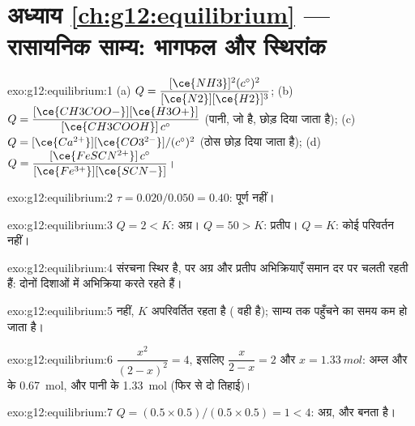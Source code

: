 \section*{अध्याय \ref{ch:g12:equilibrium} --- रासायनिक साम्य: भागफल और स्थिरांक}

\begin{solution}{exo:g12:equilibrium:1}
(a) $Q = \dfrac{[\ce{NH3}]^2 (c^\circ)^2}{[\ce{N2}][\ce{H2}]^3}$;
(b) $Q = \dfrac{[\ce{CH3COO-}][\ce{H3O+}]}{[\ce{CH3COOH}]\,c^\circ}$ (पानी,
जो  है, छोड़ दिया जाता है);
(c) $Q = [\ce{Ca^{2+}}][\ce{CO3^{2-}}]/(c^\circ)^2$ (ठोस छोड़ दिया जाता है);
(d) $Q = \dfrac{[\ce{FeSCN^{2+}}]\,c^\circ}{[\ce{Fe^{3+}}][\ce{SCN-}]}$।
\end{solution}

\begin{solution}{exo:g12:equilibrium:2}
$\tau = 0.020/0.050 = 0.40$: पूर्ण नहीं।
\end{solution}

\begin{solution}{exo:g12:equilibrium:3}
$Q = 2 < K$: अग्र। $Q = 50 > K$: प्रतीप। $Q = K$: कोई परिवर्तन नहीं।
\end{solution}

\begin{solution}{exo:g12:equilibrium:4}
संरचना स्थिर है, पर अग्र और प्रतीप अभिक्रियाएँ समान दर पर
चलती रहती हैं:  दोनों दिशाओं में अभिक्रिया करते रहते हैं।
\end{solution}

\begin{solution}{exo:g12:equilibrium:5}
नहीं, $K$ अपरिवर्तित रहता है ( वही है); साम्य तक पहुँचने का
समय कम हो जाता है।
\end{solution}

\begin{solution}{exo:g12:equilibrium:6}
$\dfrac{x^2}{(2-x)^2} = 4$, इसलिए $\dfrac{x}{2-x} = 2$ और
$x = \qty{1.33}{mol}$: अम्ल और  के \qty{0.67}{mol},
 और पानी के \qty{1.33}{mol} (फिर से दो तिहाई)।
\end{solution}

\begin{solution}{exo:g12:equilibrium:7}
$Q = (0.5 \times 0.5)/(0.5 \times 0.5) = 1 < 4$: अग्र, और 
बनता है।
\end{solution}

